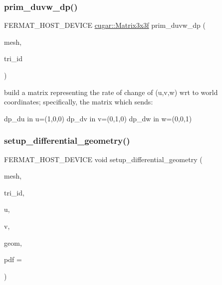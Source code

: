 \subsubsection{\texorpdfstring{prim\+\_\+duvw\+\_\+dp()}{prim\_duvw\_dp()}}
{\footnotesize\ttfamily F\+E\+R\+M\+A\+T\+\_\+\+H\+O\+S\+T\+\_\+\+D\+E\+V\+I\+CE \hyperlink{structcugar_1_1_matrix}{cugar\+::\+Matrix3x3f} prim\+\_\+duvw\+\_\+dp (\begin{DoxyParamCaption}\item[{const \hyperlink{struct_mesh_view}{Mesh\+View} \&}]{mesh,  }\item[{const uint32}]{tri\+\_\+id }\end{DoxyParamCaption})\hspace{0.3cm}{\ttfamily [inline]}}

build a matrix representing the rate of change of (u,v,w) wrt to world coordinates; specifically, the matrix which sends\+:

dp\+\_\+du in u=(1,0,0) dp\+\_\+dv in v=(0,1,0) dp\+\_\+dw in w=(0,0,1) \mbox{\label{group___mesh_module_ga4fa88a02d11b01ea12e6a602b3e3e5c2}} 
\subsubsection{\texorpdfstring{setup\+\_\+differential\+\_\+geometry()}{setup\_differential\_geometry()}\hspace{0.1cm}{\footnotesize\ttfamily [1/2]}}
{\footnotesize\ttfamily F\+E\+R\+M\+A\+T\+\_\+\+H\+O\+S\+T\+\_\+\+D\+E\+V\+I\+CE void setup\+\_\+differential\+\_\+geometry (\begin{DoxyParamCaption}\item[{const \hyperlink{struct_mesh_view}{Mesh\+View} \&}]{mesh,  }\item[{const uint32}]{tri\+\_\+id,  }\item[{const float}]{u,  }\item[{const float}]{v,  }\item[{\hyperlink{struct_vertex_geometry}{Vertex\+Geometry} $\ast$}]{geom,  }\item[{float $\ast$}]{pdf = {} }\end{DoxyParamCaption})\hspace{0.3cm}{\ttfamily [inline]}}

